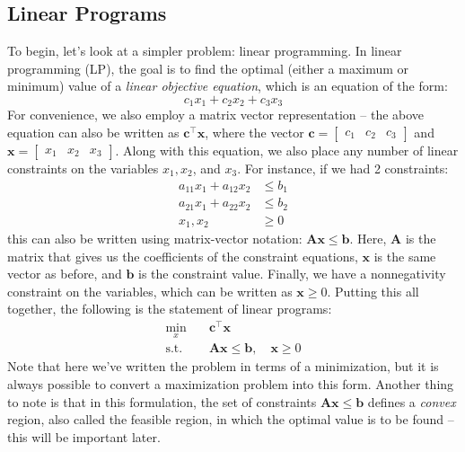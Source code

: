 \documentclass[11pt]{article}
\begin{document}
	\subsection{Linear Programs}
    \label{LP}
	To begin, let's look at a simpler problem: linear programming. In linear programming (LP), the goal is to find 
	the optimal (either a maximum or minimum) value of a \textit{linear objective equation}, which is an equation
	of the form:
	\[
	c_1x_1 + c_2x_2 + c_3x_3 
	\] 
	For convenience, we also employ a matrix vector representation -- the above equation can also be written as 
	\( \mathbf c^{\top} \mathbf x \), where the vector \( \mathbf c = \begin{bmatrix} c_1 & c_2 & c_3 \end{bmatrix} \) 
	and \( \mathbf x = \begin{bmatrix} x_1 & x_2 & x_3 \end{bmatrix}  \). Along with this equation, we also place 
	any number of linear constraints on the variables \( x_1, x_2 \), and \( x_3 \). For instance, if we had 2 
	constraints:
	\begin{align*}
		a_{11}x_1 + a_{12}x_2 &\le b_1\\
		a_{21}x_1 + a_{22}x_2 &\le b_2\\
		x_1, x_2 &\ge 0
	\end{align*} 
	this can also be written using matrix-vector notation: \( \mathbf{Ax} \le \mathbf b \). Here, \( \mathbf A \) is
	the matrix that gives us the coefficients of the constraint equations, \( \mathbf x \) is the same vector as 
	before, and \( \mathbf b \) is the constraint value. Finally, we have a nonnegativity constraint on the 
	variables, which can be written as \( \mathbf x \ge 0 \). Putting this all together, the following is the 
	statement of linear programs: 
	\begin{align*}
		\min_x \quad &\mathbf c^{\top} \mathbf x\\
		\text{s.t.} \quad &	\mathbf{Ax} \le  \mathbf b, \quad \mathbf x \ge 0
	\end{align*}
	Note that here we've written the problem in terms of a minimization, 
 but it is always possible to convert a 
	maximization problem into this form. Another thing to note is that in this formulation, the set of 
	constraints \( \mathbf{Ax} \le \mathbf b \) defines a \textit{convex} region, also called the 
	feasible region, in which the optimal value is to be found -- this will be important later.
\end{document}
